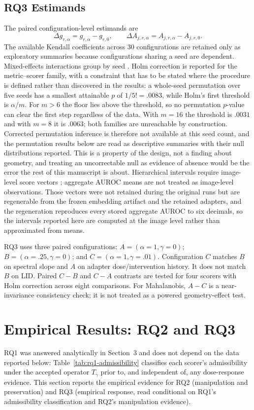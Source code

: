 \documentclass[11pt,a4paper]{article}
\begin{document}
\subsection{RQ3 Estimands}
The paired configuration-level estimands are
\begin{equation}
\Delta g_{r,\alpha}=g_{r,\alpha}-g_{r,0},\qquad
\Delta A_{j,r,\alpha}=A_{j,r,\alpha}-A_{j,r,0}.
\end{equation}
The available Kendall coefficients across 30 configurations are retained only as exploratory summaries because configurations sharing a seed are dependent. Mixed-effects interactions group by seed \cite{b18}. Holm correction \cite{b19} is reported for the metric--scorer family, with a constraint that has to be stated where the procedure is defined rather than discovered in the results: a whole-seed permutation over five seeds has a smallest attainable $p$ of $1/5!=.0083$, while Holm's first threshold is $\alpha/m$. For $m>6$ the floor lies above the threshold, so no permutation $p$-value can clear the first step regardless of the data. With $m=16$ the threshold is $.0031$ and with $m=8$ it is $.0063$; both families are unreachable by construction. Corrected permutation inference is therefore not available at this seed count, and the permutation results below are read as descriptive summaries with their null distributions reported. This is a property of the design, not a finding about geometry, and treating an uncorrectable null as evidence of absence would be the error the rest of this manuscript is about. Hierarchical intervals require image-level score vectors \cite{b20}; aggregate AUROC means are not treated as image-level observations. Those vectors were not retained during the original runs but are regenerable from the frozen embedding artifact and the retained adapters, and the regeneration reproduces every stored aggregate AUROC to six decimals, so the intervals reported here are computed at the image level rather than approximated from means.

RQ3 uses three paired configurations: $A=(\alpha=1,\gamma=0)$; $B=(\alpha=.25,\gamma=0)$; and $C=(\alpha=1,\gamma=.01)$. Configuration $C$ matches $B$ on spectral slope and $A$ on adapter dose/intervention history. It does not match $B$ on LID. Paired $C-B$ and $C-A$ contrasts are tested for four scorers with Holm correction across eight comparisons. For Mahalanobis, $A-C$ is a near-invariance consistency check; it is not treated as a powered geometry-effect test.

\section{Empirical Results: RQ2 and RQ3}
RQ1 was answered analytically in Section~3 and does not depend on the data reported below: Table~\ref{tab:rq1-admissibility} classifies each scorer's admissibility under the accepted operator $T_\gamma$ prior to, and independent of, any dose-response evidence. This section reports the empirical evidence for RQ2 (manipulation and preservation) and RQ3 (empirical response, read conditional on RQ1's admissibility classification and RQ2's manipulation evidence).
\end{document}
